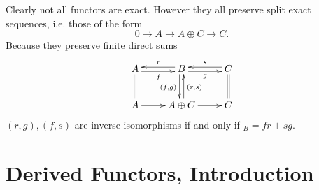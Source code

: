 \documentclass[10pt,]{book}
\theoremstyle{plain}
\theoremstyle{definition}
\numberwithin{equation}{section}
\begin{document}
          Clearly not all functors are exact.
          However they all preserve split exact sequences, i.e. those of the form
          \[0 \to A \to A\oplus C \to C.\]
          Because they preserve finite direct sums
          \[
            \xymatrix{
              A \ar@<-0.5ex>[r]_f \ar@{=}[d]& B\ar@<-0.5ex>[l]_r \ar@<-0.5ex>[d]_{(f,g)}  \ar@<-0.5ex>[r]_g & C\ar@<-0.5ex>[l]_s \ar@{=}[d]\\
              A \ar[r]& A \oplus C \ar@<-0.5ex>[u]_{(r,s)}\ar[r] &C
            }
          \]
          \((r,g),(f,s)\) are inverse isomorphisms if and only if \(_B = fr + sg\). 
\typeout{************************************************}
\typeout{************************************************}
\section[Derived Functors, Introduction]{Derived Functors, Introduction}\label{sec-derived-intro}
\end{document}
